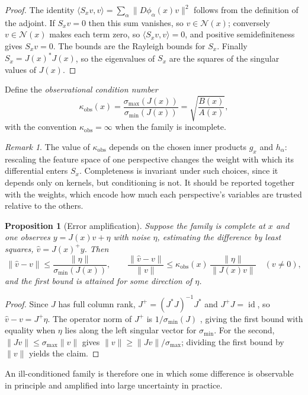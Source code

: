 \documentclass[11pt]{article}
\newtheorem{proposition}{Proposition}
\theoremstyle{remark}
\newtheorem{remark}{Remark}
\newcommand{\N}{\mathcal{N}}
\newcommand{\id}{\operatorname{id}}
\begin{document}
\begin{proof}
The identity $\langle S_xv,v\rangle=\sum_\alpha\|D\phi_\alpha(x)v\|^2$ follows from the definition of the adjoint. If $S_xv=0$ then this sum vanishes, so $v\in\N(x)$; conversely $v\in\N(x)$ makes each term zero, so $\langle S_xv,v\rangle=0$, and positive semidefiniteness gives $S_xv=0$. The bounds are the Rayleigh bounds for $S_x$. Finally $S_x=J(x)^{*}J(x)$, so the eigenvalues of $S_x$ are the squares of the singular values of $J(x)$.
\end{proof}

Define the \emph{observational condition number}
\[
\kappa_{\mathrm{obs}}(x)=\frac{\sigma_{\max}(J(x))}{\sigma_{\min}(J(x))}=\sqrt{\frac{B(x)}{A(x)}},
\]
with the convention $\kappa_{\mathrm{obs}}=\infty$ when the family is incomplete.

\begin{remark}
The value of $\kappa_{\mathrm{obs}}$ depends on the chosen inner products $g_x$ and $h_\alpha$: rescaling the feature space of one perspective changes the weight with which its differential enters $S_x$. Completeness is invariant under such choices, since it depends only on kernels, but conditioning is not. It should be reported together with the weights, which encode how much each perspective's variables are trusted relative to the others.
\end{remark}

\begin{proposition}[Error amplification]\label{prop:amp}
Suppose the family is complete at $x$ and one observes $y=J(x)v+\eta$ with noise $\eta$, estimating the difference by least squares, $\hat v=J(x)^{+}y$. Then
\[
\|\hat v-v\|\le\frac{\|\eta\|}{\sigma_{\min}(J(x))},
\qquad
\frac{\|\hat v-v\|}{\|v\|}\le\kappa_{\mathrm{obs}}(x)\,\frac{\|\eta\|}{\|J(x)v\|}\quad(v\neq0),
\]
and the first bound is attained for some direction of $\eta$.
\end{proposition}

\begin{proof}
Since $J$ has full column rank, $J^{+}=(J^{*}J)^{-1}J^{*}$ and $J^{+}J=\id$, so $\hat v-v=J^{+}\eta$. The operator norm of $J^{+}$ is $1/\sigma_{\min}(J)$ \cite{golub}, giving the first bound with equality when $\eta$ lies along the left singular vector for $\sigma_{\min}$. For the second, $\|J v\|\le\sigma_{\max}\|v\|$ gives $\|v\|\ge\|Jv\|/\sigma_{\max}$; dividing the first bound by $\|v\|$ yields the claim.
\end{proof}

An ill-conditioned family is therefore one in which some difference is observable in principle and amplified into large uncertainty in practice.
\end{document}
